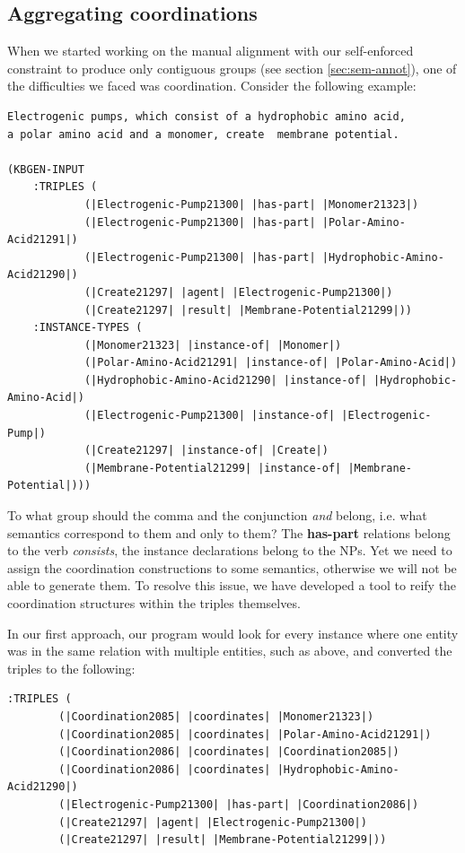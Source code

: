 \documentclass[a4paper]{article}
\begin{document}
\subsection{Aggregating coordinations}

When we started working on the manual alignment with our self-enforced
constraint to produce only contiguous groups (see section
\ref{sec:sem-annot}), one of the difficulties we faced was
coordination. Consider the following example:

\begin{verbatim}
Electrogenic pumps, which consist of a hydrophobic amino acid,
a polar amino acid and a monomer, create  membrane potential.

(KBGEN-INPUT 
    :TRIPLES (
            (|Electrogenic-Pump21300| |has-part| |Monomer21323|)
            (|Electrogenic-Pump21300| |has-part| |Polar-Amino-Acid21291|)
            (|Electrogenic-Pump21300| |has-part| |Hydrophobic-Amino-Acid21290|)
            (|Create21297| |agent| |Electrogenic-Pump21300|)
            (|Create21297| |result| |Membrane-Potential21299|))
    :INSTANCE-TYPES (
            (|Monomer21323| |instance-of| |Monomer|)
            (|Polar-Amino-Acid21291| |instance-of| |Polar-Amino-Acid|)
            (|Hydrophobic-Amino-Acid21290| |instance-of| |Hydrophobic-Amino-Acid|)
            (|Electrogenic-Pump21300| |instance-of| |Electrogenic-Pump|)
            (|Create21297| |instance-of| |Create|)
            (|Membrane-Potential21299| |instance-of| |Membrane-Potential|)))
\end{verbatim}

To what group should the comma and the conjunction \emph{and} belong,
i.e. what semantics correspond to them and only to them? The
\textbf{has-part} relations belong to the verb \emph{consists}, the
instance declarations belong to the NPs. Yet we need to assign the
coordination constructions to some semantics, otherwise we will not be
able to generate them. To resolve this issue, we have developed a tool
to reify the coordination structures within the triples themselves.

In our first approach, our program would look for every instance where
one entity was in the same relation with multiple entities, such as
above, and converted the triples to the following:

\begin{verbatim}
:TRIPLES (
        (|Coordination2085| |coordinates| |Monomer21323|)
        (|Coordination2085| |coordinates| |Polar-Amino-Acid21291|)
        (|Coordination2086| |coordinates| |Coordination2085|)
        (|Coordination2086| |coordinates| |Hydrophobic-Amino-Acid21290|)
        (|Electrogenic-Pump21300| |has-part| |Coordination2086|)
        (|Create21297| |agent| |Electrogenic-Pump21300|)
        (|Create21297| |result| |Membrane-Potential21299|))
\end{verbatim}
\end{document}
